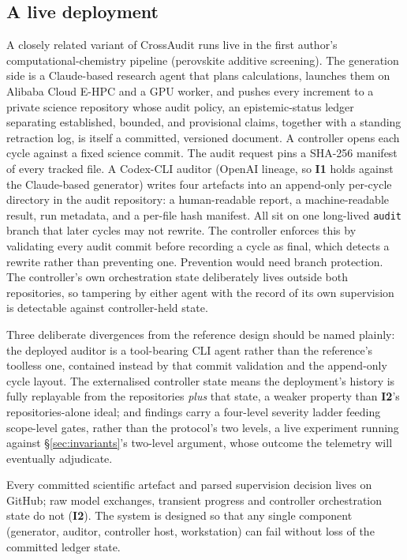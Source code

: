 \documentclass[11pt,letterpaper]{article}
\newcommand{\invariant}[1]{\textbf{I#1}}
\begin{document}
\subsection{A live deployment}

A closely related variant of CrossAudit runs live in the first author's computational-chemistry pipeline (perovskite additive screening). The generation side is a Claude-based research agent that plans calculations, launches them on Alibaba Cloud E-HPC and a GPU worker, and pushes every increment to a private science repository whose audit policy, an epistemic-status ledger separating established, bounded, and provisional claims, together with a standing retraction log, is itself a committed, versioned document. A controller opens each cycle against a fixed science commit. The audit request pins a SHA-256 manifest of every tracked file. A Codex-CLI auditor (OpenAI lineage, so \invariant{1} holds against the Claude-based generator) writes four artefacts into an append-only per-cycle directory in the audit repository: a human-readable report, a machine-readable result, run metadata, and a per-file hash manifest. All sit on one long-lived \texttt{audit} branch that later cycles may not rewrite. The controller enforces this by validating every audit commit before recording a cycle as final, which detects a rewrite rather than preventing one. Prevention would need branch protection. The controller's own orchestration state deliberately lives outside both repositories, so tampering by either agent with the record of its own supervision is detectable against controller-held state. 

Three deliberate divergences from the reference design should be named plainly: the deployed auditor is a tool-bearing CLI agent rather than the reference's toolless one, contained instead by that commit validation and the append-only cycle layout. The externalised controller state means the deployment's history is fully replayable from the repositories \emph{plus} that state, a weaker property than \invariant{2}'s repositories-alone ideal; and findings carry a four-level severity ladder feeding scope-level gates, rather than the protocol's two levels, a live experiment running against \S\ref{sec:invariants}'s two-level argument, whose outcome the telemetry will eventually adjudicate. 

Every committed scientific artefact and parsed supervision decision lives on GitHub; raw model exchanges, transient progress and controller orchestration state do not (\invariant{2}). The system is designed so that any single component (generator, auditor, controller host, workstation) can fail without loss of the committed ledger state.
\end{document}
